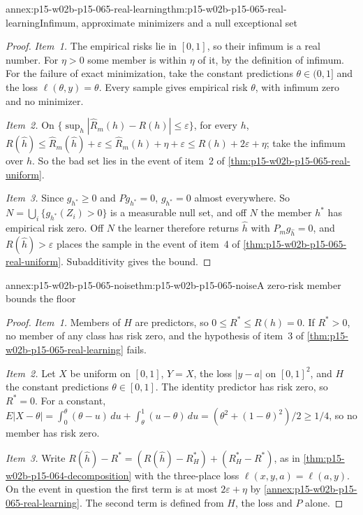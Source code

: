 \begin{annexitem}{annex:p15-w02b-p15-065-real-learning}{thm:p15-w02b-p15-065-real-learning}{Infimum, approximate minimizers and a null exceptional set}
\begin{proof}
\emph{Item~1.} The empirical risks lie in \([0,1]\), so their infimum is a
real number. For \(\eta>0\) some member is within \(\eta\) of it, by the
definition of infimum. For the failure of exact minimization, take the
constant predictions \(\theta\in(0,1]\) and the loss \(\ell(\theta,y)=\theta\).
Every sample gives empirical risk \(\theta\), with infimum zero and no
minimizer.

\emph{Item~2.} On \(\{\sup_h|\widehat R_m(h)-R(h)|\leq\varepsilon\}\), for
every \(h\),
\(R(\widehat h)\leq\widehat R_m(\widehat h)+\varepsilon\leq\widehat R_m(h)
+\eta+\varepsilon\leq R(h)+2\varepsilon+\eta\); take the infimum over
\(h\). So the bad set lies in the event of item~2 of
\cref{thm:p15-w02b-p15-065-real-uniform}.

\emph{Item~3.} Since \(g_{h^{*}}\geq0\) and \(Pg_{h^{*}}=0\),
\(g_{h^{*}}=0\) almost everywhere. So
\(N=\bigcup_i\{g_{h^{*}}(Z_i)>0\}\) is a measurable null set, and off \(N\)
the member \(h^{*}\) has empirical risk zero. Off \(N\) the learner
therefore returns \(\widehat h\) with \(P_mg_{\widehat h}=0\), and
\(R(\widehat h)>\varepsilon\) places the sample in the event of item~4 of
\cref{thm:p15-w02b-p15-065-real-uniform}. Subadditivity gives the bound.
\end{proof}
\end{annexitem}

\begin{annexitem}{annex:p15-w02b-p15-065-noise}{thm:p15-w02b-p15-065-noise}{A zero-risk member bounds the floor}
\begin{proof}
\emph{Item~1.} Members of \(H\) are predictors, so
\(0\leq R^{*}\leq R(h)=0\). If \(R^{*}>0\), no member of any class has
risk zero, and the hypothesis of item~3 of
\cref{thm:p15-w02b-p15-065-real-learning} fails.

\emph{Item~2.} Let \(X\) be uniform on \([0,1]\), \(Y=X\), the loss
\(|y-a|\) on \([0,1]^2\), and \(H\) the constant predictions
\(\theta\in[0,1]\). The identity predictor has risk zero, so \(R^{*}=0\).
For a constant,
\(E|X-\theta|=\int_0^\theta(\theta-u)\,du+\int_\theta^1(u-\theta)\,du
=(\theta^2+(1-\theta)^2)/2\geq1/4\), so no member has risk zero.

\emph{Item~3.} Write
\(R(\widehat h)-R^{*}=(R(\widehat h)-R_H^{*})+(R_H^{*}-R^{*})\), as in
\cref{thm:p15-w02b-p15-064-decomposition} with the three-place loss
\(\ell(x,y,a)=\ell(a,y)\). On the event in question the first term is at
most \(2\varepsilon+\eta\) by
\cref{annex:p15-w02b-p15-065-real-learning}. The second term is defined
from \(H\), the loss and \(P\) alone.
\end{proof}
\end{annexitem}

